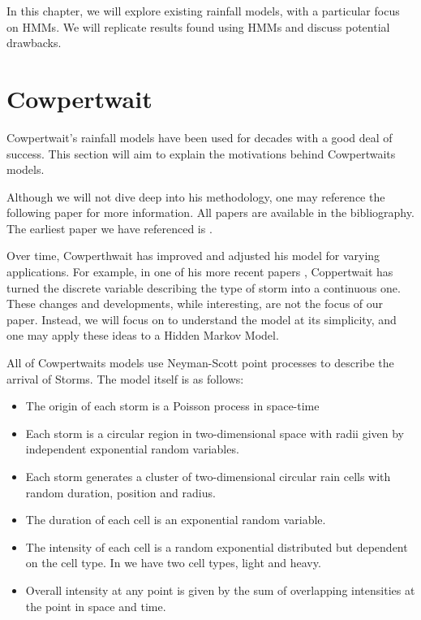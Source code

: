 
In this chapter, we will explore existing rainfall models, with a particular focus on HMMs. We will replicate results found using HMMs and discuss potential drawbacks.

\section{Cowpertwait}
\label{Replicating_Existing_Rainfall_Model:Cowpertwait}
Cowpertwait's rainfall models have been used for decades with a good deal of success. This section will aim to explain the motivations behind Cowpertwaits models.

Although we will not dive deep into his methodology, one may reference the following paper for more information. All papers are available in the bibliography. The earliest paper we have referenced is \cite{Cowpertwait1994}.

Over time, Cowperthwait has improved and adjusted his model for varying applications. For example, in one of his more recent papers \cite{Cowpertwait2010}, Coppertwait has turned the discrete variable describing the type of storm into a continuous one. These changes and developments, while interesting, are not the focus of our paper. Instead, we will focus on \cite{Cowpertwait1994} to understand the model at its simplicity, and one may apply these ideas to a Hidden Markov Model. 

All of Cowpertwaits models use Neyman-Scott point processes to describe the arrival of Storms. The model itself is as follows:
\begin{itemize}
    \item The origin of each storm is a Poisson process in space-time
    \item Each storm is a circular region in two-dimensional space with radii given by independent exponential random variables.
    \item Each storm generates a cluster of two-dimensional circular rain cells with random duration, position and radius. 
    \item The duration of each cell is an exponential random variable.
    \item The intensity of each cell is a random exponential distributed but dependent on the cell type. In \cite{Cowpertwait1994} we have two cell types, light and heavy.
    \item Overall intensity at any point is given by the sum of overlapping intensities at the point in space and time.
\end{itemize}

